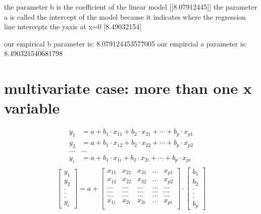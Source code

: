 \documentclass[letterpaper,10pt,english]{jupyterBook}
\begin{document}
\begin{sphinxVerbatim}[commandchars=\\\{\}]
the parameter b is the coefficient of the linear model [[8.07912445]]
the parameter a is called the intercept of the model because it indicates
 where the regression line intercepts the y\PYGZhy{}axis at x=0 [\PYGZhy{}8.49032154]

our empirical b parameter is: 8.079124453577005
our empircial a parameter is: \PYGZhy{}8.490321540681798
\end{sphinxVerbatim}


\chapter{multivariate case: more than one x variable}
\label{\detokenize{Regression_Techniques:multivariate-case-more-than-one-x-variable}}\begin{align*}
    y_1&=a+b_1\cdot x_{11}+b_2\cdot x_{21}+\cdots + b_p\cdot x_{p1}\\
    y_2&=a+b_1\cdot x_{12}+b_2\cdot x_{22}+\cdots + b_p\cdot x_{p2}\\
    \ldots& \ldots\\
    y_i&=a+b_1\cdot x_{1i}+b_2\cdot x_{2i}+\cdots + b_p\cdot x_{pi}\\
\end{align*}\begin{equation*}
    \begin{bmatrix}
      y_1\\
      y_2\\
      .  \\
      .  \\
      .  \\
      y_i
    \end{bmatrix}
    = a+
    \begin{bmatrix}
      x_{11} & x_{21} & x_{31} & \ldots & x_{p1}\\
      x_{12} & x_{22} & x_{32} & \ldots & x_{p2}\\
      \ldots&\ldots&\ldots&\ldots&\ldots\\
      \ldots&\ldots&\ldots&\ldots&\ldots\\
      \ldots&\ldots&\ldots&\ldots&\ldots\\
      x_{1i} & x_{2i} & x_{3i} & \ldots & x_{pi}\\
    \end{bmatrix}
    \cdot
    \begin{bmatrix}
 b_1\\
      b_2\\
      .\\
      .\\
      .\\
      b_p
    \end{bmatrix}
\end{equation*}
\end{document}
